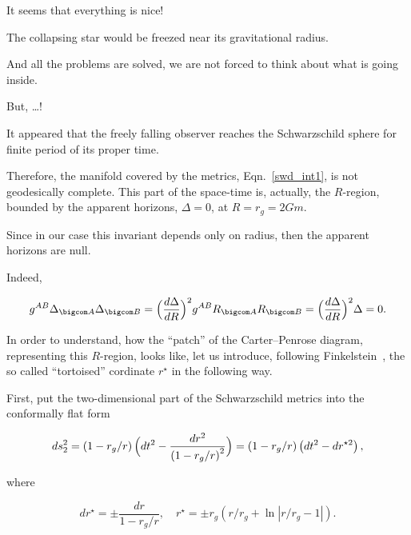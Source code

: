 It seems that everything is nice! 

The collapsing star would be freezed near its gravitational radius. 

And all the problems are solved, we are not forced to think about what is going inside. 

But, \ldots ! 

It appeared that  the freely falling observer reaches the Schwarzschild sphere for finite period of its proper time. 

Therefore, the manifold covered by the metrics, Eqn.~\eqref{swd_int1}, is not geodesically complete. This part of the space-time is, actually, the $R$-region, bounded by the apparent horizons, $\Delta = 0$, at $R = r_g = 2 G m$. 

Since in our case this invariant depends only on radius, then the apparent horizons are null. 

Indeed, 

$$

g^{AB} \Delta_{\bigcom A} \Delta_{\bigcom B} = \Bigl(\frac{d \Delta}{dR} \Bigr)^2 g^{AB} R_{\bigcom A} R_{\bigcom B} = \Bigl(\frac{d \Delta}{dR} \Bigr)^2 \Delta = 0.

$$ 

In order to understand, how the ``patch'' of the Carter--Penrose diagram, repre\-sen\-ting this $R$-region, looks like, let us introduce, following Finkelstein~\cite{berez:Fin}, the so called ``tortoised'' cordinate $r^{\star}$ in the following way. 

First, put the two-dimensional part of the Schwarzschild metrics into the conformally flat form

\begin{equation}

\label{conff}

ds_2^2 = \left(1 - {r_g}/{r} \right) 

\Bigl(dt^2 - \frac{dr^2}{\left(1 - {r_g}/{r} \right)^2} \Bigr) =  \left(1 - {r_g}/{r} \right) \left(dt^2 - dr^{\star 2} \right) ,

\end{equation}

where

\begin{equation}

\label{tort}

dr^{\star} = \pm \frac{dr}{1 - {r_g}/{r}} , \quad 

r^{\star} = \pm r_g \left({r}/{r_g} + \ln {\left|{r}/{r_g} - 1 \right|} \right) .

\end{equation}

